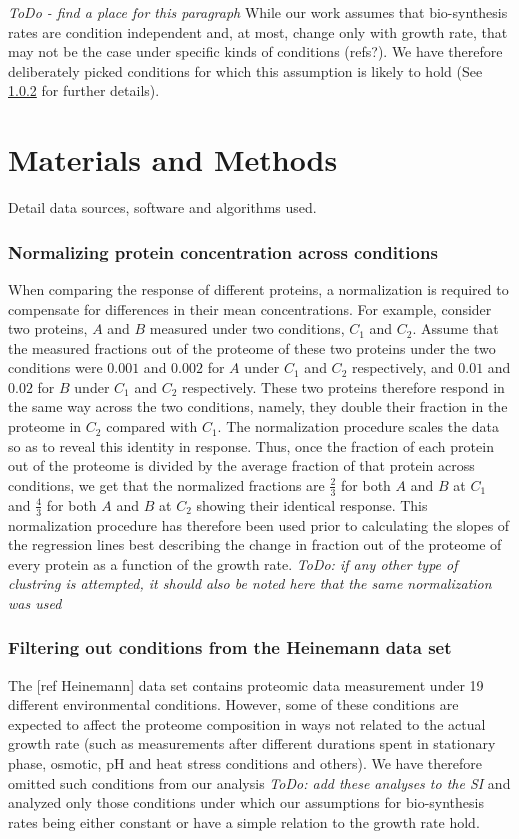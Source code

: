 \documentclass[notitlepage]{article}
\begin{document}
\emph{ToDo - find a place for this paragraph}
While our work assumes that bio-synthesis rates are condition independent and, at most, change only with growth rate, that may not be the case under specific kinds of conditions (refs?).
We have therefore deliberately picked conditions for which this assumption is likely to hold (See \ref{heinemanncond} for further details).

\section{Materials and Methods}
Detail data sources, software and algorithms used.
\subsubsection{Normalizing protein concentration across conditions}
\label{concacrossconds}
When comparing the response of different proteins, a normalization is required to compensate for differences in their mean concentrations.
For example, consider two proteins, $A$ and $B$ measured under two conditions, $C_1$ and $C_2$.
Assume that the measured fractions out of the proteome of these two proteins under the two conditions were $0.001$ and $0.002$ for $A$ under $C_1$ and $C_2$ respectively, and $0.01$ and $0.02$ for $B$ under $C_1$ and $C_2$ respectively.
These two proteins therefore respond in the same way across the two conditions, namely, they double their fraction in the proteome in $C_2$ compared with $C_1$.
The normalization procedure scales the data so as to reveal this identity in response.
Thus, once the fraction of each protein out of the proteome is divided by the average fraction of that protein across conditions, we get that the normalized fractions are $\frac{2}{3}$ for both $A$ and $B$ at $C_1$ and $\frac{4}{3}$ for both $A$ and $B$ at $C_2$ showing their identical response.
This normalization procedure has therefore been used prior to calculating the slopes of the regression lines best describing the change in fraction out of the proteome of every protein as a function of the growth rate.
\emph{ToDo: if any other type of clustring is attempted, it should also be noted here that the same normalization was used}
\subsubsection{Filtering out conditions from the Heinemann data set}
\label{heinemanncond}
The [ref Heinemann] data set contains proteomic data measurement under 19 different environmental conditions.
However, some of these conditions are expected to affect the proteome composition in ways not related to the actual growth rate (such as measurements after different durations spent in stationary phase, osmotic, pH and heat stress conditions and others).
We have therefore omitted such conditions from our analysis \emph{ToDo: add these analyses to the SI} and analyzed only those conditions under which our assumptions for bio-synthesis rates being either constant or have a simple relation to the growth rate hold.
\end{document}
